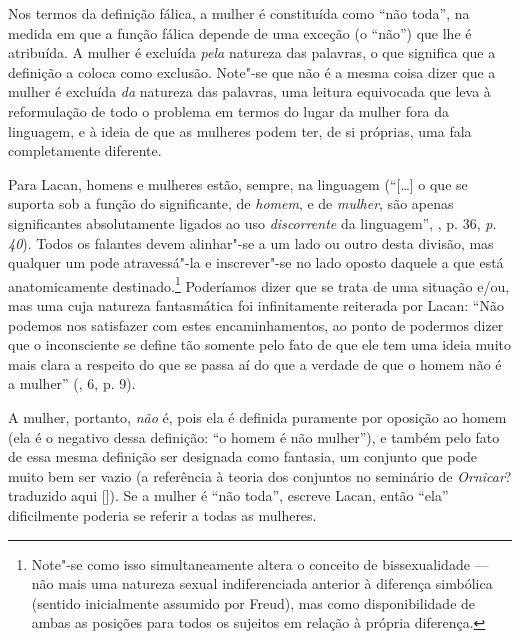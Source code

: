 Nos termos da definição fálica, a mulher é constituída como ``não
toda'', na medida em que a função fálica depende de uma exceção (o
``não'') que lhe é atribuída. A mulher é excluída \emph{pela} natureza
das palavras, o que significa que a definição a coloca como exclusão.
Note"-se que não é a mesma coisa dizer que a mulher é excluída \emph{da}
natureza das palavras, uma leitura equivocada que leva à reformulação de
todo o problema em termos do lugar da mulher fora da linguagem, e à
ideia de que as mulheres podem ter, de si próprias, uma fala
completamente diferente.

Para Lacan, homens e mulheres estão, sempre, na linguagem (``[\ldots{}] o que
se suporta sob a função do significante, de \emph{homem}, e de
\emph{mulher}, são apenas significantes absolutamente ligados ao uso
\emph{discorrente} da linguagem'', , p. 36, \emph{p. 40}). Todos os
falantes devem alinhar"-se a um lado ou outro desta divisão, mas qualquer
um pode atravessá"-la e inscrever"-se no lado oposto daquele a que está
anatomicamente destinado.\footnote{Note"-se como isso simultaneamente
  altera o conceito de bissexualidade --- não mais uma natureza sexual
  indiferenciada anterior à diferença simbólica (sentido inicialmente
  assumido por Freud), mas como disponibilidade de ambas as posições
  para todos os sujeitos em relação à própria diferença.} Poderíamos
dizer que se trata de uma situação e/ou, mas uma cuja natureza
fantasmática foi infinitamente reiterada por Lacan: ``Não podemos nos
satisfazer com estes encaminhamentos, ao ponto de podermos dizer que o
inconsciente se define tão somente pelo fato de que ele tem uma ideia
muito mais clara a respeito do que se passa aí do que a verdade de que o
homem não é a mulher'' (, 6, p. 9). %

A mulher, portanto, \emph{não} é, pois ela é definida puramente por
oposição ao homem (ela é o negativo dessa definição: ``o homem é não
mulher''), e também pelo fato de essa mesma definição ser designada como
fantasia, um conjunto que pode muito bem ser vazio (a referência à
teoria dos conjuntos no seminário de \emph{Ornicar}? traduzido aqui
[]). Se a mulher é ``não toda'', escreve Lacan, então ``ela''
dificilmente poderia se referir a todas as mulheres.

